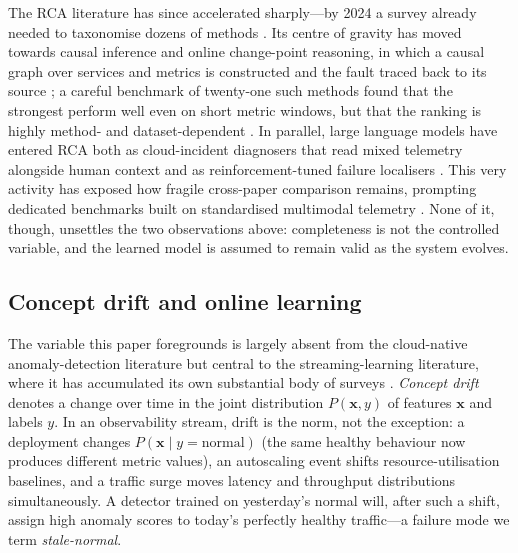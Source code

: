 \documentclass[acmsmall]{acmart}
\begin{document}
The RCA literature has since accelerated sharply---by 2024 a survey already needed to taxonomise dozens of methods \cite{wang2024rcasurvey}. Its centre of gravity has moved towards causal inference and online change-point reasoning, in which a causal graph over services and metrics is constructed and the fault traced back to its source \cite{pham2024rca,yao2024chainofevent,pham2024baro}; a careful benchmark of twenty-one such methods found that the strongest perform well even on short metric windows, but that the ranking is highly method- and dataset-dependent \cite{pham2024rca}. In parallel, large language models have entered RCA both as cloud-incident diagnosers that read mixed telemetry alongside human context \cite{chen2024rca} and as reinforcement-tuned failure localisers \cite{zhang2025thinkfl}. This very activity has exposed how fragile cross-paper comparison remains, prompting dedicated benchmarks built on standardised multimodal telemetry \cite{pham2025rcaeval}. None of it, though, unsettles the two observations above: completeness is not the controlled variable, and the learned model is assumed to remain valid as the system evolves.

\subsection{Concept drift and online learning}\label{sec:bg-drift}

The variable this paper foregrounds is largely absent from the cloud-native anomaly-detection literature but central to the streaming-learning literature, where it has accumulated its own substantial body of surveys \cite{arora2024drift,hovakimyan2024drift,lukats2025drift}. \emph{Concept drift} denotes a change over time in the joint distribution $P(\mathbf{x}, y)$ of features $\mathbf{x}$ and labels $y$. In an observability stream, drift is the norm, not the exception: a deployment changes $P(\mathbf{x} \mid y{=}\text{normal})$ (the same healthy behaviour now produces different metric values), an autoscaling event shifts resource-utilisation baselines, and a traffic surge moves latency and throughput distributions simultaneously. A detector trained on yesterday's normal will, after such a shift, assign high anomaly scores to today's perfectly healthy traffic---a failure mode we term \emph{stale-normal}.
\end{document}
